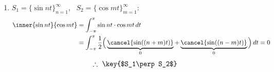 \begin{enumerate}[label=\arabic*)]
Consider $\{e^{jnt}\}_{n=-\infty}^{\infty}$, \quad $e^{jnt}\in\V$ for all $n$.
\[
\inner{f_1(t)}{f_2(t)} = \int_{-\pi}^{\pi} f_1(t)\,\overline{f_2(t)}\,dt
\]
\begin{align*}
\inner{e^{jnt}}{e^{jmt}} &= \int_{-\pi}^{\pi} e^{jnt}\,e^{-jmt}\,dt = \int_{-\pi}^{\pi} e^{j(n-m)t}\,dt\\
&= \int_{-\pi}^{\pi}\big[\cos((n-m)t) + j\sin((n-m)t)\big]\,dt\\
&= \int_{-\pi}^{\pi}\cos((n-m)t)\,dt + j\underbrace{\cancel{\int_{-\pi}^{\pi}\sin((n-m)t)\,dt}}_{0}
\end{align*}
\begin{center}
\begin{minipage}{0.5\textwidth}
\small $\left.\begin{array}{l}\sin t\\ \sin 2t\\ \sin 3t\\ \ \vdots\end{array}\right\}$ all zero due to integral over a period
\end{minipage}%
\begin{minipage}{0.35\textwidth}
\centering
{}
\end{minipage}
\end{center}
\begin{align*}
\inner{e^{jnt}}{e^{jmt}} &= \begin{cases} 2\pi, & n = m\\ 0, & n\neq m\end{cases}\\
&= 2\pi\,\delta_{nm}
\end{align*}
\item $S_1 = \{\sin nt\}_{n=1}^\infty$, \ $S_2 = \{\cos mt\}_{m=1}^\infty$:
\begin{align*}
\inner{\sin nt}{\cos mt} &= \int_{-\pi}^{\pi}\sin nt\cdot\cos mt\,dt\\
&= \int_{-\pi}^{\pi}\frac12\Big(\underbrace{\cancel{\sin((n+m)t)}}_{0} + \underbrace{\cancel{\sin((n-m)t)}}_{0}\Big)\,dt = 0
\end{align*}
\[
\therefore\ \key{$S_1\perp S_2$}
\]
\end{enumerate}

